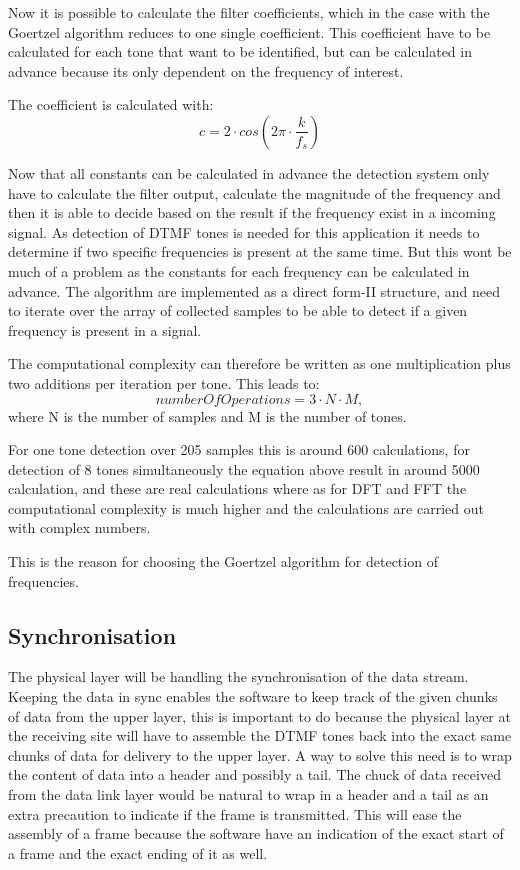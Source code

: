 	Now it is possible to calculate the filter coefficients, which in the case with the Goertzel algorithm reduces 
	to one single coefficient. This coefficient have to be calculated for each tone that want to be identified, but can 
	be calculated in advance because its only dependent on the frequency of interest.
	
	The coefficient is calculated with:
	\begin{equation}c = 2\cdot cos(2\pi \cdot \frac{k}{f_{s}})\end{equation}
	
	Now that all constants can be calculated in advance the detection system only have to calculate the filter output, calculate
	the magnitude of the frequency and then it is able to decide based on the result if the frequency exist in a incoming signal.
	As detection of DTMF tones is needed for this application it needs to determine if two specific frequencies is present at the
	same time. But this wont be much of a problem as the constants for each frequency can be calculated in advance.
	The algorithm are implemented as a direct form-II structure, and need to iterate over the array of collected samples to be
	able to detect if a given frequency is present in a signal.
	
	The computational complexity can therefore be written as one multiplication plus two additions per iteration per tone.
	This leads to:
	\begin{equation}numberOfOperations = 3\cdot N\cdot M,\end{equation}
	where N is the number of samples and M is the number of tones.
	
	For one tone detection over 205 samples this is around 600 calculations, for detection of 8 tones simultaneously the equation
	above result in around 5000 calculation, and these are real calculations where as for DFT and FFT the computational complexity 
	is much higher and the calculations are carried out with complex numbers.
	
	This is the reason for choosing the Goertzel algorithm for detection of frequencies.
	
	\subsection{Synchronisation}
	The physical layer will be handling the synchronisation of the data stream. Keeping the data in sync enables the software to
	keep track of the given chunks of data from the upper layer, this is important to do because the physical layer at the receiving
	site will have to assemble the DTMF tones back into the exact same chunks of data for delivery to the upper layer.
	A way to solve this need is to wrap the content of data into a header and possibly a tail. The chuck of data received from the 
	data link layer would be natural to wrap in a header and a tail as an extra precaution to indicate if the frame is transmitted.
	This will ease the assembly of a frame because the software have an indication of the exact start of a frame and the exact ending
	of it as well.
	
